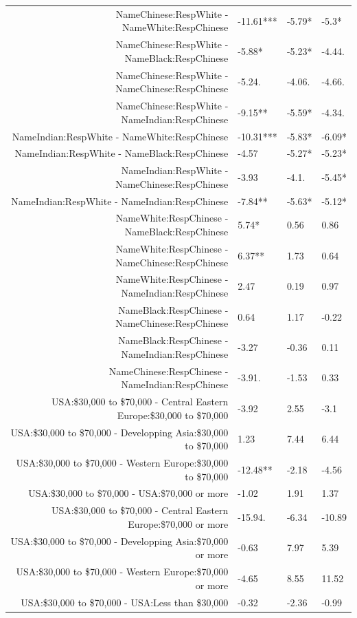 \documentclass[]{report}
\begin{document}
\begin{table}[ht]
{\begin{tabular}{rlll}
		NameChinese:RespWhite - NameWhite:RespChinese & -11.61*** & -5.79* & -5.3* \\ 
		NameChinese:RespWhite - NameBlack:RespChinese & -5.88* & -5.23* & -4.44. \\ 
		NameChinese:RespWhite - NameChinese:RespChinese & -5.24. & -4.06. & -4.66. \\ 
		NameChinese:RespWhite - NameIndian:RespChinese & -9.15** & -5.59* & -4.34. \\ 
		NameIndian:RespWhite - NameWhite:RespChinese & -10.31*** & -5.83* & -6.09* \\ 
		NameIndian:RespWhite - NameBlack:RespChinese & -4.57 & -5.27* & -5.23* \\ 
		NameIndian:RespWhite - NameChinese:RespChinese & -3.93 & -4.1. & -5.45* \\ 
		NameIndian:RespWhite - NameIndian:RespChinese & -7.84** & -5.63* & -5.12* \\ 
		NameWhite:RespChinese - NameBlack:RespChinese & 5.74* & 0.56 & 0.86 \\ 
		NameWhite:RespChinese - NameChinese:RespChinese & 6.37** & 1.73 & 0.64 \\ 
		NameWhite:RespChinese - NameIndian:RespChinese & 2.47 & 0.19 & 0.97 \\ 
		NameBlack:RespChinese - NameChinese:RespChinese & 0.64 & 1.17 & -0.22 \\ 
		NameBlack:RespChinese - NameIndian:RespChinese & -3.27 & -0.36 & 0.11 \\ 
		NameChinese:RespChinese - NameIndian:RespChinese & -3.91. & -1.53 & 0.33 \\ 
		USA:\$30,000 to \$70,000 - Central Eastern Europe:\$30,000 to \$70,000 & -3.92 & 2.55 & -3.1 \\ 
		USA:\$30,000 to \$70,000 - Developping Asia:\$30,000 to \$70,000 & 1.23 & 7.44 & 6.44 \\ 
		USA:\$30,000 to \$70,000 - Western Europe:\$30,000 to \$70,000 & -12.48** & -2.18 & -4.56 \\ 
		USA:\$30,000 to \$70,000 - USA:\$70,000 or more & -1.02 & 1.91 & 1.37 \\ 
		USA:\$30,000 to \$70,000 - Central Eastern Europe:\$70,000 or more & -15.94. & -6.34 & -10.89 \\ 
		USA:\$30,000 to \$70,000 - Developping Asia:\$70,000 or more & -0.63 & 7.97 & 5.39 \\ 
		USA:\$30,000 to \$70,000 - Western Europe:\$70,000 or more & -4.65 & 8.55 & 11.52 \\ 
		USA:\$30,000 to \$70,000 - USA:Less than \$30,000 & -0.32 & -2.36 & -0.99 \\ 

\end{tabular}}
\end{table}
\end{document}
